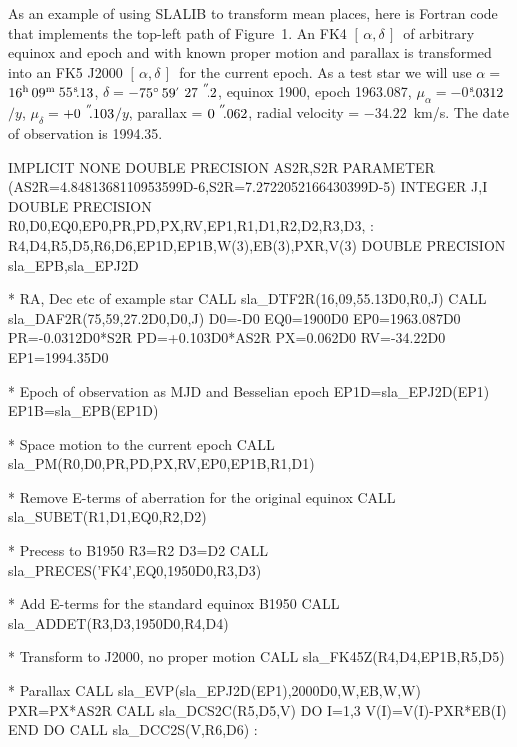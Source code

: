\documentclass[11pt,twoside,nolof]{starlink}
\providecommand{\radec}     {$[\,\alpha,\delta\,]$}
\providecommand{\arcsec}[2] {\arcseci{#1}$\hspace{-0.4em}.#2$}
\providecommand{\arcseci}[1] {$#1\hspace{-0.05em}$\raisebox{-0.5ex}
                         {$^{'\hspace{-0.1em}'}$}}
\providecommand{\dms}[4]    {$#1^{\circ}\,#2\raisebox{-0.5ex}
                        {$^{'}$}\,$\arcsec{#3}{#4}}
\providecommand{\tseci}[1]   {$#1$\mbox{$^{\rm s}$}}
\providecommand{\tsec}[2]    {\tseci{#1}$\hspace{-0.3em}.#2$}
\providecommand{\hms}[4]    {$#1^{\rm h}\,#2^{\rm m}\,$\tsec{#3}{#4}}
\begin{document}
As an example of using SLALIB to transform mean places, here is
Fortran code that implements the top-left path of Figure~1.
An FK4 \radec\ of arbitrary equinox and epoch and with
known proper motion and
parallax is transformed into an FK5 J2000 \radec\ for the current
epoch.  As a test star we will use $\alpha=$\hms{16}{09}{55}{13},
$\delta=$\dms{-75}{59}{27}{2}, equinox 1900, epoch 1963.087,
$\mu_\alpha=$\tsec{-0}{0312}$/y$, $\mu_\delta=$\arcsec{+0}{103}$/y$,
parallax = \arcsec{0}{062}, radial velocity = $-34.22$~km/s.  The
date of observation is 1994.35.
\goodbreak
\begin{terminalv}
            IMPLICIT NONE
            DOUBLE PRECISION AS2R,S2R
            PARAMETER (AS2R=4.8481368110953599D-6,S2R=7.2722052166430399D-5)
            INTEGER J,I
            DOUBLE PRECISION R0,D0,EQ0,EP0,PR,PD,PX,RV,EP1,R1,D1,R2,D2,R3,D3,
           :                 R4,D4,R5,D5,R6,D6,EP1D,EP1B,W(3),EB(3),PXR,V(3)
            DOUBLE PRECISION sla_EPB,sla_EPJ2D

      *  RA, Dec etc of example star
            CALL sla_DTF2R(16,09,55.13D0,R0,J)
            CALL sla_DAF2R(75,59,27.2D0,D0,J)
            D0=-D0
            EQ0=1900D0
            EP0=1963.087D0
            PR=-0.0312D0*S2R
            PD=+0.103D0*AS2R
            PX=0.062D0
            RV=-34.22D0
            EP1=1994.35D0

      *  Epoch of observation as MJD and Besselian epoch
            EP1D=sla_EPJ2D(EP1)
            EP1B=sla_EPB(EP1D)

      *  Space motion to the current epoch
            CALL sla_PM(R0,D0,PR,PD,PX,RV,EP0,EP1B,R1,D1)

      *  Remove E-terms of aberration for the original equinox
            CALL sla_SUBET(R1,D1,EQ0,R2,D2)

      *  Precess to B1950
            R3=R2
            D3=D2
            CALL sla_PRECES('FK4',EQ0,1950D0,R3,D3)

      *  Add E-terms for the standard equinox B1950
            CALL sla_ADDET(R3,D3,1950D0,R4,D4)

      *  Transform to J2000, no proper motion
            CALL sla_FK45Z(R4,D4,EP1B,R5,D5)

      *  Parallax
            CALL sla_EVP(sla_EPJ2D(EP1),2000D0,W,EB,W,W)
            PXR=PX*AS2R
            CALL sla_DCS2C(R5,D5,V)
            DO I=1,3
               V(I)=V(I)-PXR*EB(I)
            END DO
            CALL sla_DCC2S(V,R6,D6)
             :
\end{terminalv}
\end{document}
